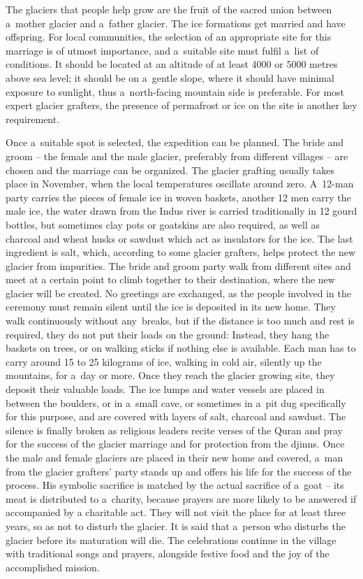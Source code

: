 The glaciers that people help grow are the fruit of the sacred union between a mother glacier and a father
glacier. The ice formations get married and have offspring. For local communities, the selection of an appropriate site for this marriage is of
utmost importance, and a suitable site must fulfil a list of conditions. It should be located at an altitude of
at least 4000 or 5000 metres above sea level; it should be on a gentle slope, where it should have minimal
exposure to sunlight, thus a north-facing mountain side is preferable. For most expert glacier grafters,
the presence of permafrost or ice on the site is another key requirement. 

Once a suitable spot is selected, the expedition can be planned. The bride and groom – the female and the
male glacier, preferably from different villages – are chosen and the marriage can be organized. The glacier
grafting usually takes place in November, when the local temperatures oscillate around zero. A 12-man party
carries the pieces of female ice in woven baskets, another 12 men carry the male ice, the water drawn from the
Indus river is carried traditionally in 12 gourd bottles, but sometimes clay pots or goatskins are also
required, as well as charcoal and wheat husks or sawdust which act as insulators for the ice. The last
ingredient is salt, which, according to some glacier grafters, helps protect the new glacier from impurities.
The bride and groom party walk from different sites and meet at a certain point to climb together to their destination, where the new glacier will be created. No greetings are exchanged, as the people involved in the ceremony must remain silent until
the ice is deposited in its new home. They walk continuously without any breaks, but if the distance is too
much and rest is required, they do not put their loads on the ground: Instead, they hang the baskets on trees, or
on walking sticks if nothing else is available. Each man has to carry around 15 to 25 kilograms of ice, walking
in cold air, silently up the mountains, for a day or more. Once they reach the glacier growing site, they
deposit their valuable loads. The ice lumps and water vessels are placed in between the boulders, or in a small
cave, or sometimes in a pit dug specifically for this purpose, and are covered with layers of salt, charcoal and sawdust. The silence is
finally broken as religious leaders recite verses of the Quran and pray for the success of the glacier marriage
and for protection from the djinns. Once the male and female glaciers are placed in their new home and covered,
a man from the glacier grafters' party stands up and offers his life for the success of the process. His
symbolic sacrifice is matched by the actual sacrifice of a goat – its meat is distributed to a charity, because
prayers are more likely to be answered if accompanied by a charitable act. They will not visit the place for at
least three years, so as not to disturb the glacier. It is said that a person who disturbs the glacier before
its maturation will die. The celebrations continue in the village with traditional songs and prayers, alongside
festive food and the joy of the accomplished mission.

